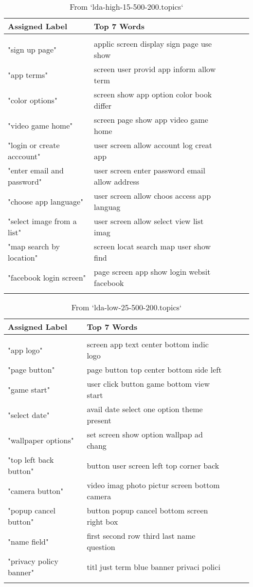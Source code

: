 \documentclass[11pt,twoside]{article}
\theoremstyle{theorem}
\begin{document}
\begin{table}[]
\caption{From `lda-high-15-500-200.topics`}
\begin{tabular}{lllll}
\hline
Assigned Label & Top 7 Words \\ \hline \\
 "sign up page" & applic screen display sign page use show \\ 
 "app terms" & screen user provid app inform allow term  \\ 
 "color options" & screen show app option color book differ  \\ 
 "video game home" & screen page show app video game home  \\ 
 "login or create acccount" & user screen allow account log creat app \\ 
 "enter email and password" & user screen enter password email allow address  \\ 
 "choose app language" & user screen allow choos access app languag  \\ 
 "select image from a list" & user screen allow select view list imag   \\ 
 "map search by location" & screen locat search map user show find  \\ 
 "facebook login screen" & page screen app show login websit facebook   \\ 
 &  &  \\ \hline
\end{tabular}
\end{table}


\begin{table}[]
\caption{From `lda-low-25-500-200.topics`}
\begin{tabular}{lllll}
\hline
Assigned Label & Top 7 Words \\ \hline \\
 "app logo" & screen app text center bottom indic logo \\ 
 "page button" & page button top center bottom side left   \\ 
 "game start" & user click button game bottom view start \\ 
 "select date" & avail date select one option theme present  \\ 
 "wallpaper options" & set screen show option wallpap ad chang   \\ 
 "top left back button" & button user screen left top corner back   \\ 
 "camera button" & video imag photo pictur screen bottom camera  \\ 
 "popup cancel button" & button popup cancel bottom screen right box   \\ 
 "name field" & first second row third last name question   \\ 
 "privacy policy banner" & titl just term blue banner privaci polici  \\ 
 &  &  \\ \hline
\end{tabular}
\end{table}
\end{document}

